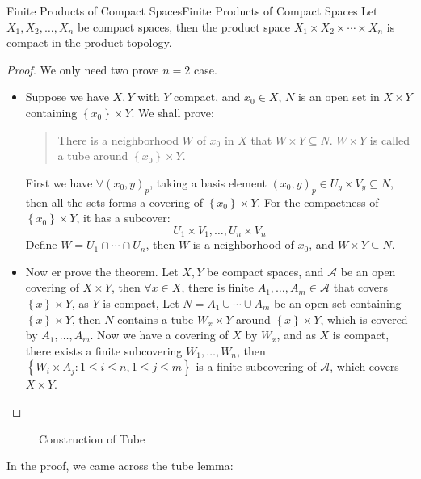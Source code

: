 \documentclass[../main.tex]{subfiles}
\begin{document}
\begin{theorem}{Finite Products of Compact Spaces}{Finite Products of Compact Spaces}
Let $X_1,X_2,\ldots,X_n$ be compact spaces, then the product space $X_1 \times X_2 \times \cdots \times X_n$ is compact in the product topology.
\end{theorem}
\begin{proof}
We only need two prove $n=2$ case.
\begin{itemize}
\item Suppose we have $X,Y$ with $Y$ compact, and $x_0\in X$, $N$ is an open set in $X \times Y$ containing $\left\{ x_0 \right\} \times Y$. We shall prove:
	\begin{quote}
	There is a neighborhood $W$ of $x_0$ in $X$ that $W \times Y \subseteq N$. $W \times Y$ is called a tube around $\left\{ x_0 \right\}\times Y$.
	\end{quote}
First we have $\forall (x_0,y)_p$, taking a basis element $(x_0,y)_p \in U_y \times V_y \subseteq N$, then all the sets forms a covering of $\left\{ x_0 \right\} \times Y$. For the compactness of $\left\{ x_0 \right\}\times Y$, it has a subcover:
\begin{equation*}
U_1 \times V_1, \ldots , U_n \times V_n
\end{equation*}
Define $W = U_1\cap \cdots \cap U_n$, then $W$ is a neighborhood of $x_0$, and $W \times Y \subseteq N$.
\item Now er prove the theorem. Let $X,Y$ be compact spaces, and $\mathcal{A}$ be an open covering of $X \times Y$, then $\forall x\in X$, there is finite $A_1, \ldots ,A_m\in \mathcal{A}$ that covers $\left\{ x \right\}\times Y$, as $Y$ is compact, Let $N = A_1\cup \cdots \cup A_m$ be an open set containing $\left\{ x \right\}\times Y$, then $N$ contains a tube $W_x \times Y$ around $\left\{ x \right\}\times Y$, which is covered by $A_1, \ldots ,A_m$. Now we have a covering of $X$ by $W_x$, and as $X$ is compact, there exists a finite subcovering $W_1, \ldots ,W_n$, then $\left\{ W_i \times A_j : 1\leq i\leq n,1\leq j\leq m \right\}$ is a finite subcovering of $\mathcal{A}$, which covers $X \times Y$.
\end{itemize}
\end{proof}

\begin{figure}[ht]
    \centering
    \caption{Construction of Tube}
    \label{fig:construction-of-tube}
\end{figure}

In the proof, we came across the tube lemma:
\end{document}
